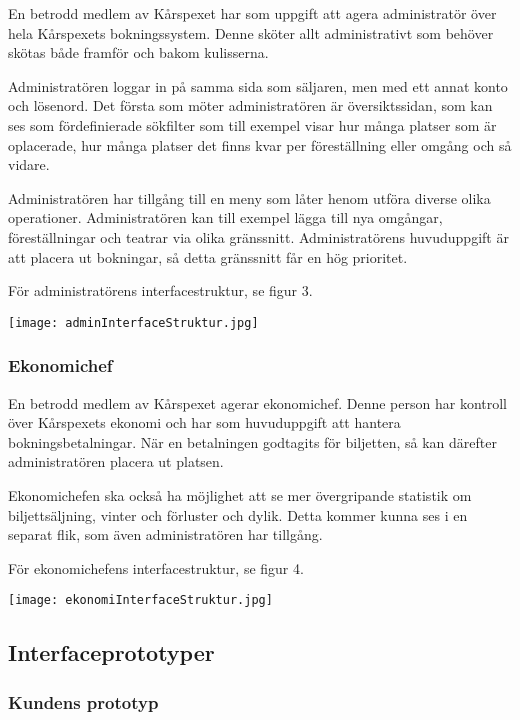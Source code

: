 \documentclass[a4paper, twoside, 11pt, titlepage]{article}
\begin{document}
		En betrodd medlem av Kårspexet har som uppgift att agera administratör över hela Kårspexets bokningssystem. Denne sköter allt administrativt som behöver skötas både framför och bakom kulisserna. 

		Administratören loggar in på samma sida som säljaren, men med ett annat konto och lösenord. Det första som möter administratören är översiktssidan, som kan ses som fördefinierade sökfilter som till exempel visar hur många platser som är oplacerade, hur många platser det finns kvar per föreställning eller omgång och så vidare. 

		Administratören har tillgång till en meny som låter henom utföra diverse olika operationer. Administratören kan till exempel lägga till nya omgångar, föreställningar och teatrar via olika gränssnitt. Administratörens huvuduppgift är att placera ut bokningar, så detta gränssnitt får en hög prioritet.  

		För administratörens interfacestruktur, se figur 3.

		\texttt{[image: adminInterfaceStruktur.jpg]}

		\subsubsection{Ekonomichef}


		En betrodd medlem av Kårspexet agerar ekonomichef. Denne person har kontroll över Kårspexets ekonomi och har som huvuduppgift att hantera bokningsbetalningar. När en betalningen godtagits för biljetten, så kan därefter administratören placera ut platsen.

		Ekonomichefen ska också ha möjlighet att se mer övergripande statistik om biljettsäljning, vinter och förluster och dylik. Detta kommer kunna ses i en separat flik, som även administratören har tillgång.

		För ekonomichefens interfacestruktur, se figur 4.

		\texttt{[image: ekonomiInterfaceStruktur.jpg]}

	\subsection{Interfaceprototyper}



		\subsubsection{Kundens prototyp}
\end{document}
